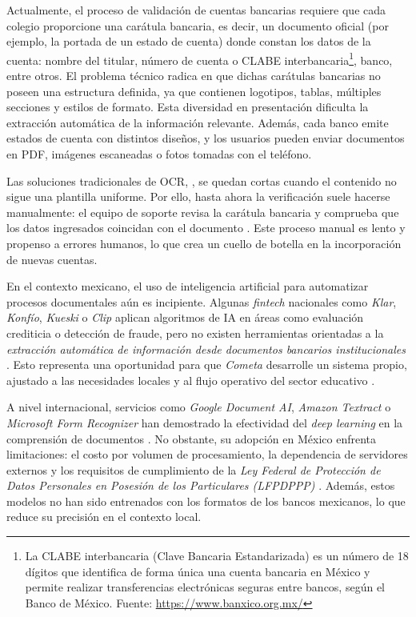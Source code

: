 Actualmente, el proceso de validación de cuentas bancarias requiere que cada colegio proporcione una carátula bancaria, es decir, un documento oficial (por ejemplo, la portada de un estado de cuenta) donde constan los datos de la cuenta: nombre del titular, número de cuenta o CLABE interbancaria\footnote{La CLABE interbancaria (Clave Bancaria Estandarizada) es un número de 18 dígitos que identifica de forma única una cuenta bancaria en México y permite realizar transferencias electrónicas seguras entre bancos, según el Banco de México. Fuente: \url{https://www.banxico.org.mx/}}, banco, entre otros. El problema técnico radica en que dichas carátulas bancarias no poseen una estructura definida, ya que contienen logotipos, tablas, múltiples secciones y estilos de formato. Esta diversidad en presentación dificulta la extracción automática de la información relevante. Además, cada banco emite estados de cuenta con distintos diseños, y los usuarios pueden enviar documentos en PDF, imágenes escaneadas o fotos tomadas con el teléfono. 

Las soluciones tradicionales de OCR, , se quedan cortas cuando el contenido no sigue una plantilla uniforme. Por ello, hasta ahora la verificación suele hacerse manualmente: el equipo de soporte revisa la carátula bancaria y comprueba que los datos ingresados coincidan con el documento \cite{validacion_clabe}. Este proceso manual es lento y propenso a errores humanos, lo que crea un cuello de botella en la incorporación de nuevas cuentas.


En el contexto mexicano, el uso de inteligencia artificial para automatizar procesos documentales aún es incipiente. Algunas \textit{fintech} nacionales como \textit{Klar}, \textit{Konfío}, \textit{Kueski} o \textit{Clip} aplican algoritmos de IA en áreas como evaluación crediticia o detección de fraude, pero no existen herramientas orientadas a la \textit{extracción automática de información desde documentos bancarios institucionales} \cite{klar,konfio,kueski,clip}. Esto representa una oportunidad para que \textit{Cometa} desarrolle un sistema propio, ajustado a las necesidades locales y al flujo operativo del sector educativo \cite{cometa_inversion}.

A nivel internacional, servicios como \textit{Google Document AI}, \textit{Amazon Textract} o \textit{Microsoft Form Recognizer} han demostrado la efectividad del \textit{deep learning} en la comprensión de documentos \cite{layoutlm,doclaynet}. No obstante, su adopción en México enfrenta limitaciones: el costo por volumen de procesamiento, la dependencia de servidores externos y los requisitos de cumplimiento de la \textit{Ley Federal de Protección de Datos Personales en Posesión de los Particulares (LFPDPPP)} \cite{lfpdppp}. Además, estos modelos no han sido entrenados con los formatos de los bancos mexicanos, lo que reduce su precisión en el contexto local.

